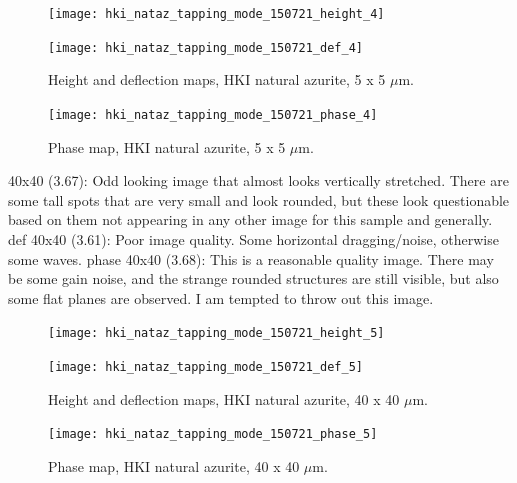 \begin{figure}[H]
\centering
\begin{minipage}{.45\textwidth}
  \centering
  \texttt{[image: hki\_nataz\_tapping\_mode\_150721\_height\_4]}
\end{minipage}
\begin{minipage}{.45\textwidth}
  \centering
  \texttt{[image: hki\_nataz\_tapping\_mode\_150721\_def\_4]}
\end{minipage}
\caption[Height and deflection maps, HKI natural azurite]{Height and deflection maps, HKI natural azurite, 5 x 5 $\mu$m.}
\label{fig:afm_hki_nataz_height_def_4}
\end{figure}

\begin{figure}[H]
\centering
  \texttt{[image: hki\_nataz\_tapping\_mode\_150721\_phase\_4]}
\caption[Phase map, HKI natural azurite]{Phase map, HKI natural azurite, 5 x 5 $\mu$m.}
\label{fig:afm_hki_nataz_phase_4}
\end{figure}

40x40 (3.67): Odd looking image that almost looks vertically stretched. There are some tall spots that are very small and look rounded, but these look questionable based on them not appearing in any other image for this sample and generally.
def 40x40 (3.61): Poor image quality. Some horizontal dragging/noise, otherwise some waves.
phase 40x40 (3.68): This is a reasonable quality image. There may be some gain noise, and the strange rounded structures are still visible, but also some flat planes are observed. I am tempted to throw out this image. 


\begin{figure}[H]
\centering
\begin{minipage}{.45\textwidth}
  \centering
  \texttt{[image: hki\_nataz\_tapping\_mode\_150721\_height\_5]}
\end{minipage}
\begin{minipage}{.45\textwidth}
  \centering
  \texttt{[image: hki\_nataz\_tapping\_mode\_150721\_def\_5]}
\end{minipage}
\caption[Height and deflection maps, HKI natural azurite]{Height and deflection maps, HKI natural azurite, 40 x 40 $\mu$m.}
\label{fig:afm_hki_nataz_height_def_5}
\end{figure}

\begin{figure}[H]
\centering
  \texttt{[image: hki\_nataz\_tapping\_mode\_150721\_phase\_5]}
\caption[Phase map, HKI natural azurite]{Phase map, HKI natural azurite, 40 x 40 $\mu$m.}
\label{fig:afm_hki_nataz_phase_5}
\end{figure}

